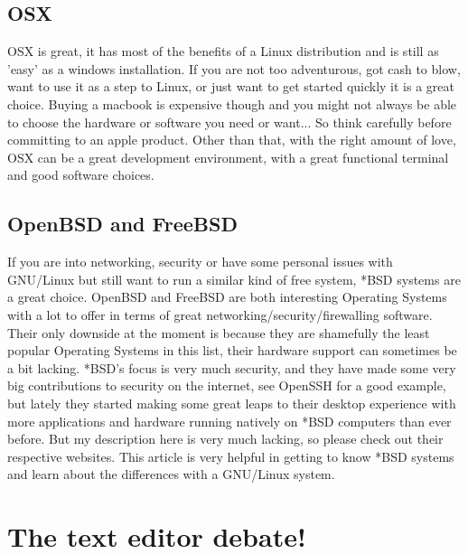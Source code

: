 \documentclass[paper=a4, fontsize=10pt]{scrartcl} %
\numberwithin{equation}{section} %
\numberwithin{figure}{section} %
\numberwithin{table}{section} %
\begin{document}
\subsection{OSX}
OSX is great, it has most of the benefits of a Linux distribution and is still
as 'easy' as a windows installation. If you are not too adventurous, got cash
to blow, want to use it as a step to Linux, or just want to get started quickly
it is a great choice. Buying a macbook is expensive though and you might not
always be able to choose the hardware or software you need or want... So think carefully
before committing to an apple product. Other than that, with the right amount
of love, OSX can be a great development environment, with a great functional
terminal and good software choices. 

\subsection{OpenBSD\cite{openbsd} and FreeBSD\cite{freebsd}}
If you are into networking, security or have some personal issues with
GNU/Linux but still want to run a similar kind of free system, *BSD systems are
a great choice. OpenBSD\cite{openbsd} and FreeBSD\cite{freebsd} are both interesting
Operating Systems with a lot to offer in terms of great
networking/security/firewalling software. Their only downside at the moment is
because they are shamefully the least popular Operating Systems in this list,
their hardware support can sometimes be a bit lacking. *BSD's focus is very much security, and they have made some very big contributions to
security on the internet, see OpenSSH for a good example, but lately they
started making some great leaps to their desktop experience with more
applications and hardware running natively on *BSD computers than ever before. But my description
here is very much lacking, so please check out their respective websites. This article\cite{whatisbsd} is very
helpful in getting to know *BSD systems and learn about the differences with a
GNU/Linux system. 

\section{The text editor debate!}
\end{document}
